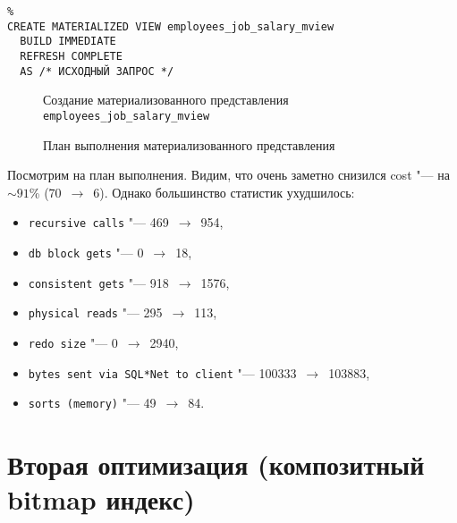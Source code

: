 \begin{verbatim}%
CREATE MATERIALIZED VIEW employees_job_salary_mview
  BUILD IMMEDIATE
  REFRESH COMPLETE
  AS /* ИСХОДНЫЙ ЗАПРОС */
\end{verbatim}
\begin{figure}[H]%
  \caption{Создание материализованного представления \texttt{employees\_job\_salary\_mview}}
  \label{jija}
\end{figure}

\begin{figure}[H]%
  \caption{План выполнения материализованного представления}
  \label{fig-task-5-mview-plan}
\end{figure}

Посмотрим на план выполнения. Видим, что очень заметно снизился cost "--- на $\sim 91$\% (70~$\to$~6).
Однако большинство статистик ухудшилось:
\begin{itemize}%
  \item \texttt{recursive calls} "--- 469~$\to$~954,
  \item \texttt{db block gets} "--- 0~$\to$~18,
  \item \texttt{consistent gets} "--- 918~$\to$~1576,
  \item \texttt{physical reads} "--- 295~$\to$~113,
  \item \texttt{redo size} "--- 0~$\to$~2940,
  \item \texttt{bytes sent via SQL*Net to client} "--- 100333~$\to$~103883,
  \item \texttt{sorts (memory)} "--- 49~$\to$~84.
\end{itemize}






\section{Вторая оптимизация (композитный bitmap индекс)}


